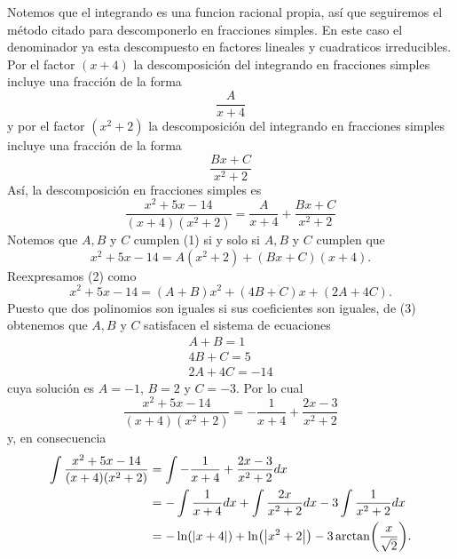 \documentclass[12pt,a4paper]{article}
\begin{document}
    \begin{solucion}
        Notemos que el integrando es una funcion racional propia, así que seguiremos el método citado para descomponerlo en fracciones simples.
        En este caso el denominador ya esta descompuesto en factores lineales y cuadraticos irreducibles. Por el factor $(x+4)$ la descomposición
        del integrando en fracciones simples incluye una fracción de la forma
        \begin{equation*}
            \frac{A}{x+4}
        \end{equation*}
        y por el factor $(x^{2}+2)$ la descomposición del integrando en fracciones simples incluye una fracción de la forma
        \begin{equation*}
            \frac{Bx+C}{x^{2}+2}
        \end{equation*}
        Así, la descomposición en fracciones simples es
        \begin{equation}
            \frac{x^{2}+5x-14}{(x+4)(x^{2}+2)}=\frac{A}{x+4}+\frac{Bx+C}{x^{2}+2}
        \end{equation}
        Notemos que $A,B$ y $C$ cumplen (1) si y solo si $A,B$ y $C$ cumplen que
        \begin{equation}
            x^{2}+5x-14=A(x^{2}+2)+(Bx+C)(x+4).
        \end{equation}
        Reexpresamos (2) como
        \begin{equation}
            x^{2}+5x-14=(A+B)x^{2}+(4B+C)x+(2A+4C).
        \end{equation}
        Puesto que dos polinomios son iguales si sus coeficientes son iguales, de (3) obtenemos que $A,B$ y $C$ satisfacen el sistema de ecuaciones
        \begin{align*}
            A+B=1\\
            4B+C=5\\
            2A+4C=-14
        \end{align*}
        cuya solución es $A=-1$, $B=2$ y $C=-3$. Por lo cual
        \begin{equation*}
            \frac{x^{2}+5x-14}{(x+4)(x^{2}+2)}=-\frac{1}{x+4}+\frac{2x-3}{x^{2}+2}
        \end{equation*}
        y, en consecuencia
        \begin{align*}
            \int\frac{x^{2}+5x-14}{(x+4)(x^{2}+2)}&=\int-\frac{1}{x+4}+\frac{2x-3}{x^{2}+2}dx\\
            &=-\int\frac{1}{x+4}dx+\int\frac{2x}{x^{2}+2}dx-3\int\frac{1}{x^{2}+2}dx\\
            &=-\ln(\abs{x+4})+\ln(\abs{x^{2}+2})-3\arctan(\frac{x}{\sqrt{2}}).
        \end{align*}
    \end{solucion}
\end{document}

